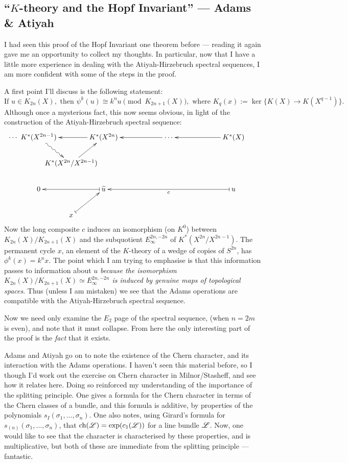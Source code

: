 \documentclass[11pt]{article}
\newcommand{\KanSemResponse}[1]
{
\thispagestyle{fancy}
\subsection*{#1}
}
\begin{document}
\begin{HopfInvOne}
\KanSemResponse
{``$K$-theory and the Hopf Invariant'' --- Adams \& Atiyah}
I had seen this proof of the Hopf Invariant one theorem before --- reading it again gave me an opportunity to collect my thoughts. In particular, now that I have a little more experience in dealing with the Atiyah-Hirzebruch spectral sequences, I am more confident with some of the steps in the proof.

A first point I'll discuss is the following statement:
\[\text{If }u\in K_{2n}(X),\text{ then }\psi^k(u)\cong k^nu\pmod{K_{2n+1}(X)},\text{ where $K_q(x):=\ker\{K(X)\to K(X^{q-1})\}$.}\]
Although once a mysterious fact, this now seems obvious, in light of the construction of the Atiyah-Hirzebruch spectral sequence:
\[\xymatrix@!0@C=1.6cm@R=1.28cm{%
\makebox[0cm][r]{$\cdots$\ }
K^*(X^{2n-1})\ar[rr];[]&&
K^*(X^{2n})\ar[rr];[]\ar[ld];[]&&
\cdots\ar[rr];[]&&
K^*(X)\\
&K^*(X^{2n}/X^{2n-1})\ar@{~>}[ul];[]&&\\
0\ar@{|->}[rr];[]&&\widetilde u\ar@{|->}[rrrr];[]^c\ar@{|->}[ld];[]&&&&u\\
&x
}\]
Now the long composite $c$ induces an isomorphism (on $K^0$) between $K_{2n}(X)/K_{2n+1}(X)$ and the subquotient $E_\infty^{2n,-2n}$ of $K^*(X^{2n}/X^{2n-1})$. The permanent cycle $x$, an element of the $K$-theory of a wedge of copies of $S^{2n}$, has $\phi^{k}(x)=k^nx$. The point which I am trying to emphasise is that this information passes to information about $u$ \emph{because the isomorphism $K_{2n}(X)/K_{2n+1}(X)\simeq E_\infty^{2n,-2n}$ is induced by genuine maps of topological spaces}. Thus (unless I am mistaken) we see that the Adams operations are compatible with the Atiyah-Hirzebruch spectral sequence.

Now we need only examine the $E_2$ page of the spectral sequence, (when $n=2m$ is even), and note that it must collapse. From here the only interesting part of the proof is the \emph{fact} that it exists.

Adams and Atiyah go on to note the existence of the Chern character, and its interaction with the Adams operations. I haven't seen this material before, so I though I'd work out the exercise on Chern character in Milnor/Stasheff, and see how it relates here. Doing so reinforced my understanding of the importance of the splitting principle. One gives a formula for the Chern character in terms of the Chern classes of a bundle, and this formula is additive, by properties of the polynomials $s_I(\sigma_1,\ldots,\sigma_n)$. One also notes, using Girard's formula for $s_{(n)}(\sigma_1,\ldots,\sigma_n)$, that $\operatorname{ch}(\mathscr{L})=\exp(c_1(\mathscr{L}))$ for a line bundle $\mathscr{L}$. Now, one would like to see that the character is characterised by these properties, and is multiplicative, but both of these are immediate from the splitting principle --- fantastic.


\end{HopfInvOne}
\end{document}
